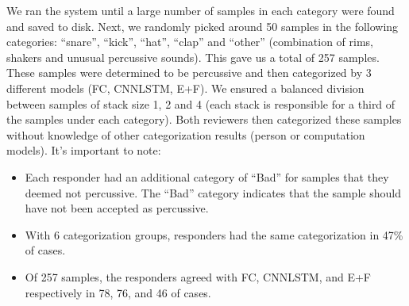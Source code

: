 \documentclass[\main/thesis.tex]{subfiles}
\begin{document}
\begin{table}[htbp]
\caption{\label{kappa_table_TPE}Table of Fleiss' kappa coefficient to measure the degree of agreement between persons (HvH), persons with FC model (H+FC), persons with CNNLSTM model, persons with all models (H+E/F), and between the 3 models. \enquote{Drop Rule} column indicates if any samples were dropped. We show the measurements after dropping samples if they are deemed bad by either or both responders. We also show measurements after dropping the \enquote{other} category along with samples deemed bad by either responder. }
\end{table}
 We ran the system until a large number of samples in each category were found and saved to disk. Next, we randomly picked around 50 samples in the following categories: \enquote{snare}, \enquote{kick}, \enquote{hat}, \enquote{clap} and \enquote{other} (combination of rims, 
shakers and unusual percussive sounds). This gave us a total of 257 samples. These samples were determined to be percussive and then categorized by 3 different models (FC, CNNLSTM, E+F). We ensured a balanced division between samples of stack size 1, 2 and 4 (each stack is responsible for a third of the samples under each category). Both reviewers then categorized these samples without knowledge of other categorization results (person or computation models). It's important to note:
\begin{itemize}
    \item Each responder had an additional category of \enquote{Bad} for samples that they deemed not percussive. The \enquote{Bad} category indicates that the sample should have not been accepted as percussive. 
    \item With 6 categorization groups, responders had the same categorization in 47\% of cases.
    \item Of 257 samples, the responders agreed with FC, CNNLSTM, and E+F respectively in 78, 76, and 46 of cases. 
\end{itemize}
\end{document}
